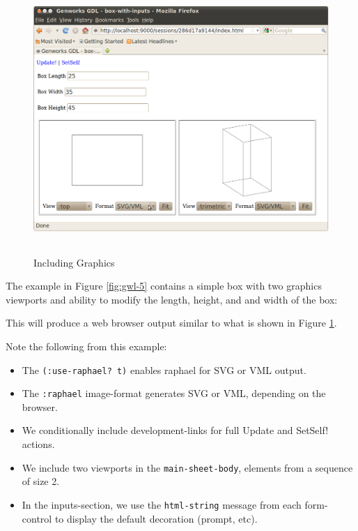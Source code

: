 \documentclass [11pt]{book}
\begin{document}
\begin{figure}
\begin{center}
\includegraphics[width=5in,height=4in]{../images/gwl-5.png}
\end{center}

\caption{Including Graphics}

\label{fig:gwl-5-image}

\end{figure}


The example in Figure 
\ref{fig:gwl-5} contains a simple box with two graphics viewports
and ability to modify the length, height, and and width of the box:



This will produce a web browser output similar to what is shown in Figure 
\ref{fig:gwl-5-image}.



Note the following from this example:

\begin{itemize}

\item The \texttt{(:use-raphael? t)} enables raphael for SVG or VML output.

\item The \texttt{:raphael} image-format generates SVG or VML, depending on the browser.

\item We conditionally include development-links for full Update and SetSelf! actions.

\item We include two viewports in the \texttt{main-sheet-body}, elements from a sequence of size 2.

\item In the inputs-section, we use
                  the \texttt{html-string} message from each
                  form-control to display the default
                  decoration (prompt, etc).

\end{itemize}
\end{document}

